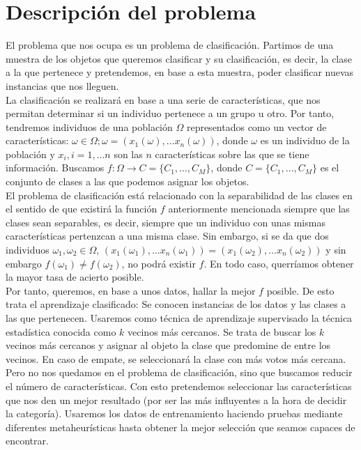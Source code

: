 \documentclass[11pt,leqno]{article}
\begin{document}
\newpage

\tableofcontents
\newpage

\section{Descripción del problema}

El problema que nos ocupa es un problema de clasificación. Partimos de una muestra de los objetos que queremos clasificar y su clasificación, es decir, la clase a la que pertenece y pretendemos, en base a esta muestra, poder clasificar nuevas instancias que nos lleguen.\\
La clasificación se realizará en base a una serie de características, que nos permitan determinar si un individuo pertenece a un grupo u otro. Por tanto, tendremos individuos de una población $\Omega$ representados como un vector de características: $ \omega \in \Omega; \omega = (x_1(\omega), \dots x_n(\omega))$, donde $\omega$ es un individuo de la población y $x_i, i=1,\dots n$ son las $n$ características sobre las que se tiene información. Buscamos $f:\Omega \longrightarrow C=\{C_1, \dots, C_M\}$, donde $C=\{C_1, \dots, C_M\}$ es el conjunto de clases a las que podemos asignar los objetos.\\
El problema de clasificación está relacionado con la separabilidad de las clases en el sentido de que existirá la función $f$  anteriormente mencionada siempre que las clases sean separables, es decir, siempre que un individuo con unas mismas características pertenzcan a una misma clase. Sin embargo, si se da que dos individuos $\omega_1, \omega_2 \in \Omega$, $(x_1(\omega_1), \dots x_n(\omega_1))=(x_1(\omega_2), \dots x_n(\omega_2))$ y sin embargo $f(\omega_1) \neq f(\omega_2)$, no podrá existir $f$. En todo caso, querríamos obtener la mayor tasa de acierto posible.\\  
Por tanto, queremos, en base a unos datos, hallar la mejor $f$ posible. De esto trata el aprendizaje clasificado: Se conocen instancias de los datos y las clases a las que pertenecen. Usaremos como técnica de aprendizaje supervisado la técnica estadística conocida como $k$ vecinos más cercanos. Se trata de buscar los $k$ vecinos más cercanos y asignar al objeto la clase que predomine de entre los vecinos. En caso de empate, se seleccionará la clase con más votos más cercana.\\  
Pero no nos quedamos en el problema de clasificación, sino que buscamos reducir el número de características. Con esto pretendemos seleccionar las características que nos den un mejor resultado (por ser las más influyentes a la hora de decidir la categoría). Usaremos los datos de entrenamiento haciendo pruebas mediante diferentes metaheurísticas hasta obtener la mejor selección que seamos capaces de encontrar.\\  
\end{document}
